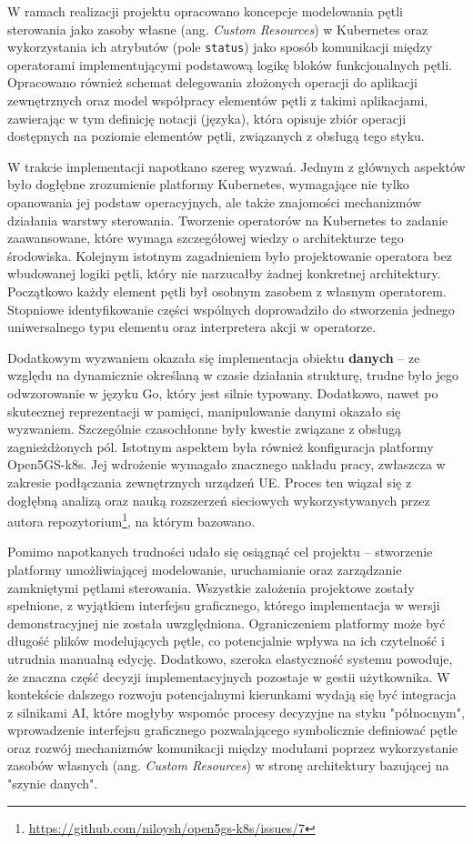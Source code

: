 W ramach realizacji projektu opracowano koncepcje modelowania pętli sterowania jako zasoby własne (ang. \textit{Custom Resources}) w Kubernetes oraz wykorzystania ich atrybutów (pole \texttt{status}) jako sposób komunikacji między operatorami implementującymi podstawową logikę bloków funkcjonalnych pętli. Opracowano również schemat delegowania złożonych operacji do aplikacji zewnętrznych oraz model współpracy elementów pętli z takimi aplikacjami, zawierając w tym definicję notacji (języka), która opisuje zbiór operacji dostępnych na poziomie elementów pętli, związanych z obsługą tego styku.

W trakcie implementacji napotkano szereg wyzwań.  Jednym z głównych aspektów było dogłębne zrozumienie platformy Kubernetes, wymagające nie tylko opanowania jej podstaw operacyjnych, ale także znajomości mechanizmów działania warstwy sterowania. Tworzenie operatorów na Kubernetes to zadanie zaawansowane, które wymaga szczegółowej wiedzy o architekturze tego środowiska. Kolejnym istotnym zagadnieniem było projektowanie operatora bez wbudowanej logiki pętli, który nie narzucałby żadnej konkretnej architektury. Początkowo każdy element pętli był osobnym zasobem z własnym operatorem. Stopniowe identyfikowanie części wspólnych doprowadziło do stworzenia jednego uniwersalnego typu elementu oraz interpretera akcji w operatorze.

Dodatkowym wyzwaniem okazała się implementacja obiektu \textbf{danych} – ze względu na dynamicznie określaną w czasie działania strukturę, trudne było jego odwzorowanie w języku Go, który jest silnie typowany. Dodatkowo, nawet po skutecznej reprezentacji w pamięci, manipulowanie danymi okazało się wyzwaniem. Szczególnie czasochłonne były kwestie związane z obsługą zagnieżdżonych pól. Istotnym aspektem była również konfiguracja platformy Open5GS-k8s. Jej wdrożenie wymagało znacznego nakładu pracy, zwłaszcza w zakresie podłączania zewnętrznych urządzeń UE. Proces ten wiązał się z dogłębną analizą oraz nauką rozszerzeń sieciowych wykorzystywanych przez autora repozytorium\footnote{\url{https://github.com/niloysh/open5gs-k8s/issues/7}}, na którym bazowano. 

Pomimo napotkanych trudności udało się osiągnąć cel projektu – stworzenie platformy umożliwiającej modelowanie, uruchamianie oraz zarządzanie zamkniętymi pętlami sterowania. Wszystkie założenia projektowe zostały spełnione, z wyjątkiem interfejsu graficznego, którego implementacja w wersji demonstracyjnej nie została uwzględniona. Ograniczeniem platformy może być długość plików modelujących pętle, co potencjalnie wpływa na ich czytelność i utrudnia manualną edycję. Dodatkowo, szeroka elastyczność systemu powoduje, że znaczna część decyzji implementacyjnych pozostaje w gestii użytkownika. W kontekście dalszego rozwoju potencjalnymi kierunkami wydają się być integracja z silnikami AI, które mogłyby wspomóc procesy decyzyjne na styku "północnym", wprowadzenie interfejsu graficznego pozwalającego symbolicznie definiować pętle oraz rozwój mechanizmów komunikacji między modułami poprzez wykorzystanie zasobów własnych (ang. \textit{Custom Resources}) w stronę architektury bazującej na "szynie danych".